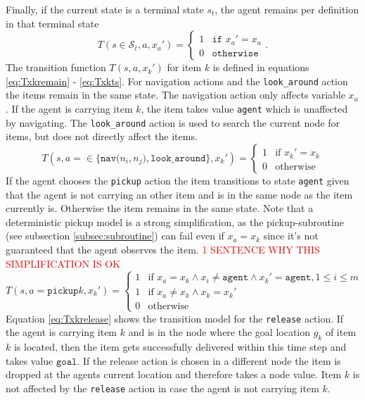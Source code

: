 Finally, if the current state is a terminal state $s_t$, the agent remains per definition in that terminal state
\begin{equation}\label{eq:Tstxa}
    T(s\in\mathcal{S}_t, a, x_a') = \begin{cases}1 &\texttt{if }x_a'=x_a\\
         0& \texttt{otherwise}\end{cases}.
\end{equation}
The transition function $T(s, a, x_k')$ for item $k$ is defined in equations \ref{eq:Txkremain} - \ref{eq:Txkts}. For navigation actions and the \texttt{look\_around} action the items remain in the same state. The navigation action only affects variable $x_a$. If the agent is carrying item $k$, the item takes value \texttt{agent} which is unaffected by navigating. The \texttt{look\_around} action is used to search the current node for items, but does not directly affect the items.    
\begin{equation}\label{eq:Txkremain}
    T(s, a=\in\{\texttt{nav($n_i, n_j$)},\texttt{look\_around}\}, x_k') = \begin{cases}
             1 & \text{if }x_k'=x_k\\
             0 & \text{otherwise}
         \end{cases}
\end{equation}
If the agent chooses the \texttt{pickup} action the item transitions to state \texttt{agent} given that the agent is not carrying an other item and is in the same node as the item currently is. Otherwise the item remains in the same state. Note that a deterministic pickup model is a strong simplification, as the pickup-subroutine (see subsection \ref{subsec:subroutine}) can fail even if $x_a=x_k$ since it's not guaranteed that the agent observes the item. \textcolor{red}{1 SENTENCE WHY THIS SIMPLIFICATION IS OK}
\begin{equation}\label{eq:Txkpickup}
T(s,a=\texttt{pickup}k, x_k') = \begin{cases}
             1 & \text{if }x_a=x_k \land x_i\neq \texttt{agent} \land x_k'=\texttt{agent}, 1\leq i\leq m  \\
             1 & \text{if }x_a \neq x_k \land x_k=x_k' \\
             0 & \text{otherwise}
         \end{cases}
\end{equation}
Equation \ref{eq:Txkrelease} shows the transition model for the \texttt{release} action. If the agent is carrying item $k$ and is in the node where the goal location $g_k$ of item $k$ is located, then the item gets successfully delivered within this time step and takes value $\texttt{goal}$. If the release action is chosen in a different node the item is dropped at the agents current location and therefore takes a node value. Item $k$ is not affected by the \texttt{release} action in case the agent is not carrying item $k$.
